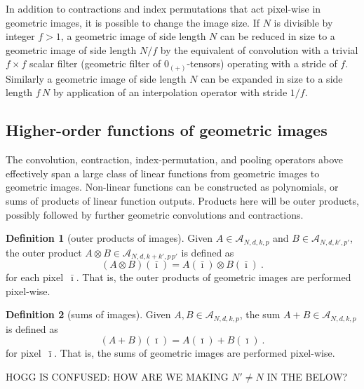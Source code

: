 \documentclass{article}
\theoremstyle{definition}
\newtheorem{definition}{Definition}
\newcommand{\tensorname}[2]{{#1}_{(#2)}}
\newcommand{\tensor}[2]{$\tensorname{#1}{#2}$-tensor}
\begin{document}
In addition to contractions and index permutations that act pixel-wise in geometric images, it is possible to change the image size.
If $N$ is divisible by integer $f>1$, a geometric image of side length $N$ can be reduced in size to a geometric image of side length $N/f$ by the equivalent of convolution with a trivial $f\times f$ scalar filter (geometric filter of \tensor{0}{+}s) operating with a stride of $f$.
Similarly a geometric image of side length $N$ can be expanded in size to a side length $f\,N$ by application of an interpolation operator with stride $1/f$.

\subsection{Higher-order functions of geometric images}\label{sec:nonlinear}

The convolution, contraction, index-permutation, and pooling operators above effectively span a large class of linear functions from geometric images to geometric images. Non-linear functions can be constructed as polynomials, or sums of products of linear function outputs.
Products here will be outer products, possibly followed by further geometric convolutions and contractions.

\begin{definition}[outer products of images]
Given $A \in \mathcal{A}_{N,d,k,p}$ and $B \in \mathcal{A}_{N,d,k',p'}$, the outer product $A\otimes B \in \mathcal{A}_{N,d,k+k',p\,p'}$ is defined as
\begin{equation}
    (A\otimes B)(\bar\imath) = A(\bar\imath)\otimes B(\bar\imath) ~.
\end{equation}
for each pixel $\,\bar\imath$. That is, the outer products of geometric images are performed pixel-wise.
\end{definition}

\begin{definition}[sums of images]
Given $A,B \in \mathcal{A}_{N,d,k,p}$, the sum $A+B \in \mathcal{A}_{N,d,k,p}$ is defined as
\begin{equation}
    (A+B)(\bar\imath) = A(\bar\imath)+B(\bar\imath) ~.
\end{equation}
for pixel $\,\bar\imath$. That is, the sums of geometric images are performed pixel-wise.
\end{definition}

HOGG IS CONFUSED: HOW ARE WE MAKING $N'\ne N$ IN THE BELOW?
\end{document}

